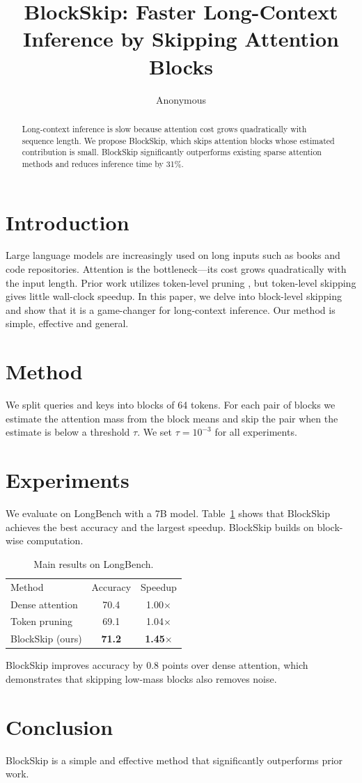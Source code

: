 \documentclass{article}
\title{BlockSkip: Faster Long-Context Inference by Skipping Attention Blocks}
\author{Anonymous}
\begin{document}
\maketitle

\begin{abstract}
Long-context inference is slow because attention cost grows quadratically with sequence length.
We propose BlockSkip, which skips attention blocks whose estimated contribution is small.
BlockSkip significantly outperforms existing sparse attention methods and reduces inference time by 31\%.
\end{abstract}

\section{Introduction}
Large language models are increasingly used on long inputs such as books and code repositories.
Attention is the bottleneck—its cost grows quadratically with the input length.
Prior work utilizes token-level pruning \cite{prune2023}, but token-level skipping gives little wall-clock speedup.
In this paper, we delve into block-level skipping and show that it is a game-changer for long-context inference.
Our method is simple, effective and general.

\section{Method}
We split queries and keys into blocks of 64 tokens.
For each pair of blocks we estimate the attention mass from the block means and skip the pair when the estimate is below a threshold $\tau$.
We set $\tau = 10^{-3}$ for all experiments.

\section{Experiments}
We evaluate on LongBench with a 7B model.
Table~\ref{tab:main} shows that BlockSkip achieves the best accuracy and the largest speedup.
BlockSkip \cite{dao2022} builds on block-wise computation.

\begin{table}[h]
\centering
\begin{tabular}{lcc}
Method & Accuracy & Speedup \\
Dense attention & 70.4 & 1.00$\times$ \\
Token pruning & 69.1 & 1.04$\times$ \\
BlockSkip (ours) & \textbf{71.2} & \textbf{1.45$\times$} \\
\end{tabular}
\caption{Main results on LongBench.}
\label{tab:main}
\end{table}

BlockSkip improves accuracy by 0.8 points over dense attention, which demonstrates that skipping low-mass blocks also removes noise.

\section{Conclusion}
BlockSkip is a simple and effective method that significantly outperforms prior work.
\end{document}
